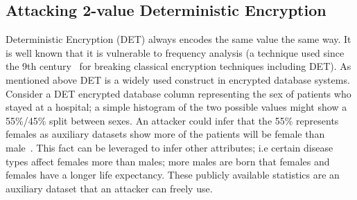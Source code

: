 \documentclass[runningheads]{llncs}
\begin{document}
\subsection{Attacking 2-value Deterministic Encryption}
Deterministic Encryption (DET) always encodes the same value the same way. It is well known that it is vulnerable to frequency analysis (a technique used since the 9th century~\cite{Arab} for breaking classical encryption techniques including DET). As mentioned above DET is a widely used construct in encrypted database systems. Consider a DET encrypted database column representing the sex of patients who stayed at a hospital; a simple histogram of the two possible values might show a 55\%/45\% split between sexes. An attacker could infer that the 55\% represents females as auxiliary datasets show more of the patients will be female than male~\cite{InfrenceAttacks}. This fact can be leveraged to infer other attributes; i.e certain disease types affect females more than males; more males are born that females and females have a longer life expectancy. These publicly available statistics are an auxiliary dataset that an attacker can freely use. 
\end{document}
